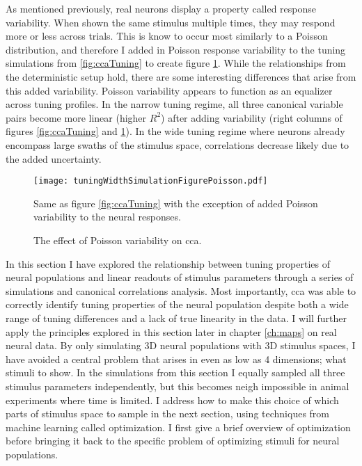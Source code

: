 As mentioned previously, real neurons display a property called response variability. When shown the same stimulus multiple times, they may respond more or less across trials. This is know to occur most similarly to a Poisson distribution, and therefore I added in Poisson response variability to the tuning simulations from \ref{fig:ccaTuning} to create figure \ref{fig:ccaTuningPoiss}. While the relationships from the deterministic setup hold, there are some interesting differences that arise from this added variability. Poisson variability appears to function as an equalizer across tuning profiles. In the narrow tuning regime, all three canonical variable pairs become more linear (higher $R^2$) after adding variability (right columns of figures \ref{fig:ccaTuning} and \ref{fig:ccaTuningPoiss}). In the wide tuning regime where neurons already encompass large swaths of the stimulus space, correlations decrease likely due to the added uncertainty.


\begin{figure}
	\centering
	\texttt{[image: tuningWidthSimulationFigurePoisson.pdf]}
	\caption{The effect of Poisson variability on \gls{cca}.}{Same as figure \ref{fig:ccaTuning} with the exception of added Poisson variability to the neural responses.}
	\label{fig:ccaTuningPoiss}
\end{figure}

In this section I have explored the relationship between tuning properties of neural populations and linear readouts of stimulus parameters through a series of simulations and canonical correlations analysis. Most importantly, \gls{cca} was able to correctly identify tuning properties of the neural population despite both a wide range of tuning differences and a lack of true linearity in the data. I will further apply the principles explored in this section later in chapter \ref{ch:maps} on real neural data. By only simulating 3D neural populations with 3D stimulus spaces, I have avoided a central problem that arises in even as low as 4 dimensions; what stimuli to show. In the simulations from this section I equally sampled all three stimulus parameters independently, but this becomes neigh impossible in animal experiments where time is limited. I address how to make this choice of which parts of stimulus space to sample in the next section, using techniques from machine learning called optimization. I first give a brief overview of optimization before bringing it back to the specific problem of optimizing stimuli for neural populations. 

